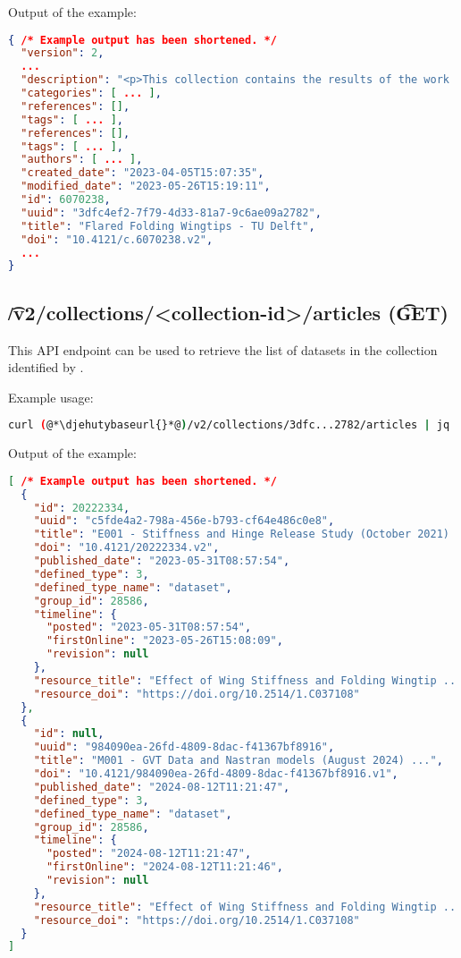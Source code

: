   Output of the example:
\begin{lstlisting}[language=JSON]
{ /* Example output has been shortened. */
  "version": 2,
  ...
  "description": "<p>This collection contains the results of the work ...",
  "categories": [ ... ],
  "references": [],
  "tags": [ ... ],
  "references": [],
  "tags": [ ... ],
  "authors": [ ... ],
  "created_date": "2023-04-05T15:07:35",
  "modified_date": "2023-05-26T15:19:11",
  "id": 6070238,
  "uuid": "3dfc4ef2-7f79-4d33-81a7-9c6ae09a2782",
  "title": "Flared Folding Wingtips - TU Delft",
  "doi": "10.4121/c.6070238.v2",
  ...
}
\end{lstlisting}

\subsection{\t{/v2/collections/<collection-id>/articles} (\t{GET})}

  This API endpoint can be used to retrieve the list of datasets in the
  collection identified by .

  Example usage:
\begin{lstlisting}[language=bash]
curl (@*\djehutybaseurl{}*@)/v2/collections/3dfc...2782/articles | jq
\end{lstlisting}

  Output of the example:
\begin{lstlisting}[language=JSON]
[ /* Example output has been shortened. */
  {
    "id": 20222334,
    "uuid": "c5fde4a2-798a-456e-b793-cf64e486c0e8",
    "title": "E001 - Stiffness and Hinge Release Study (October 2021) ...",
    "doi": "10.4121/20222334.v2",
    "published_date": "2023-05-31T08:57:54",
    "defined_type": 3,
    "defined_type_name": "dataset",
    "group_id": 28586,
    "timeline": {
      "posted": "2023-05-31T08:57:54",
      "firstOnline": "2023-05-26T15:08:09",
      "revision": null
    },
    "resource_title": "Effect of Wing Stiffness and Folding Wingtip ...",
    "resource_doi": "https://doi.org/10.2514/1.C037108"
  },
  {
    "id": null,
    "uuid": "984090ea-26fd-4809-8dac-f41367bf8916",
    "title": "M001 - GVT Data and Nastran models (August 2024) ...",
    "doi": "10.4121/984090ea-26fd-4809-8dac-f41367bf8916.v1",
    "published_date": "2024-08-12T11:21:47",
    "defined_type": 3,
    "defined_type_name": "dataset",
    "group_id": 28586,
    "timeline": {
      "posted": "2024-08-12T11:21:47",
      "firstOnline": "2024-08-12T11:21:46",
      "revision": null
    },
    "resource_title": "Effect of Wing Stiffness and Folding Wingtip ...",
    "resource_doi": "https://doi.org/10.2514/1.C037108"
  }
]
\end{lstlisting}

